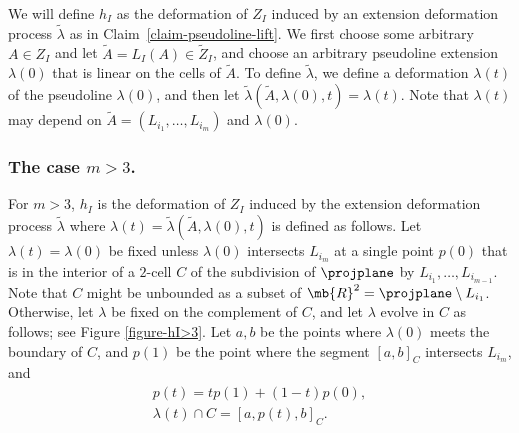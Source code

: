 We will define $h_I$ as the deformation of $Z_I$ induced by an extension deformation process $\tilde \lambda$ as in Claim~\ref{claim-pseudoline-lift}.
We first choose some arbitrary $A \in Z_{I}$ and let $\tilde A = L_I(A) \in \tilde Z_{I}$, and choose an arbitrary pseudoline extension $\lambda(0)$ that is linear on the cells of $\tilde A$. To define $\tilde \lambda$, we define a deformation $\lambda(t)$ of the pseudoline $\lambda(0)$, and then let $\tilde \lambda(\tilde A,\lambda(0),t) = \lambda(t)$. Note that $\lambda(t)$ may depend on $\tilde A = (L_{i_1},\dots,L_{i_m})$ and $\lambda(0)$.

\subsubsection*{The case $m>3$.}
For $m >3$, $h_I$ is the deformation of $Z_I$ induced by the extension deformation process $\tilde \lambda$ where $\lambda(t) = \tilde \lambda(\tilde A, \lambda(0), t)$ is defined as follows.
Let $\lambda(t) = \lambda(0)$ be fixed unless $\lambda(0)$ intersects $L_{i_m}$ at a single point $p(0)$ that is in the interior of a $2$-cell $C$ of the subdivision of $\projplane$ by $L_{i_1},\dots,L_{i_{m-1}}$.
Note that $C$ might be unbounded as a subset of $\mb{R}^2 = \projplane\setminus L_{i_1}$.
Otherwise, let $\lambda$ be fixed on the complement of $C$, and let $\lambda$ evolve in $C$ as follows; see Figure \ref{figure-hI>3}.
Let $a,b$ be the points where $\lambda(0)$ meets the boundary of $C$, and
$p(1)$ be the point where the segment $[a,b]_{C}$ intersects $L_{i_m}$,
and
\begin{gather*}
p(t) = t p(1) + (1-t) p(0), \\
\lambda(t) \cap C = \left[a,p(t),b\right]_{C}.
\end{gather*}

